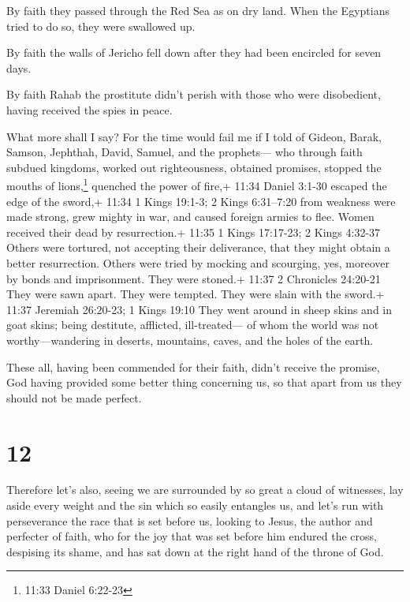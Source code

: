  By faith they passed through the Red Sea as on dry land.
When the Egyptians tried to do so, they were swallowed up.

 By faith the walls of Jericho fell down after they had
been encircled for seven days.

 By faith Rahab the prostitute didn't perish with those who
were disobedient, having received the spies in peace.

 What more shall I say? For the time would fail me if I
told of Gideon, Barak, Samson, Jephthah, David, Samuel, and the
prophets---  who through faith subdued kingdoms, worked out
righteousness, obtained promises, stopped the mouths of
lions,\footnote{11:33 Daniel 6:22-23}  quenched the power
of fire,+ 11:34 Daniel 3:1-30 escaped the edge of the sword,+ 11:34 1
Kings 19:1-3; 2 Kings 6:31--7:20 from weakness were made strong, grew
mighty in war, and caused foreign armies to flee.  Women
received their dead by resurrection.+ 11:35 1 Kings 17:17-23; 2 Kings
4:32-37 Others were tortured, not accepting their deliverance, that they
might obtain a better resurrection.  Others were tried by
mocking and scourging, yes, moreover by bonds and imprisonment.
 They were stoned.+ 11:37 2 Chronicles 24:20-21 They were
sawn apart. They were tempted. They were slain with the sword.+ 11:37
Jeremiah 26:20-23; 1 Kings 19:10 They went around in sheep skins and in
goat skins; being destitute, afflicted, ill-treated---  of
whom the world was not worthy---wandering in deserts, mountains, caves,
and the holes of the earth.

 These all, having been commended for their faith, didn't
receive the promise,  God having provided some better thing
concerning us, so that apart from us they should not be made perfect.

\hypertarget{section-11}{%
\section{12}\label{section-11}}

 Therefore let's also, seeing we are surrounded by so great
a cloud of witnesses, lay aside every weight and the sin which so easily
entangles us, and let's run with perseverance the race that is set
before us,  looking to Jesus, the author and perfecter of
faith, who for the joy that was set before him endured the cross,
despising its shame, and has sat down at the right hand of the throne of
God.

